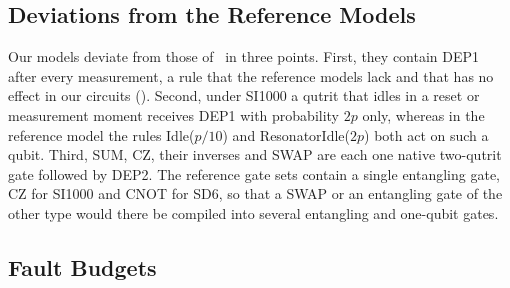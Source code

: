 \subsection{Deviations from the Reference Models}
\label{app:rounds-deviations}

Our models deviate from those of~\cite{GidneyHoneycomb2021} in three points. First, they contain DEP1 after every measurement, a rule that the reference models lack and that has no effect in our circuits (). Second, under SI1000 a qutrit that idles in a reset or measurement moment receives DEP1 with probability $2p$ only, whereas in the reference model the rules Idle($p/10$) and ResonatorIdle($2p$) both act on such a qubit. Third, SUM, CZ, their inverses and SWAP are each one native two-qutrit gate followed by DEP2. The reference gate sets contain a single entangling gate, CZ for SI1000 and CNOT for SD6, so that a SWAP or an entangling gate of the other type would there be compiled into several entangling and one-qubit gates.

\subsection{Fault Budgets}
\label{app:rounds-budget}

